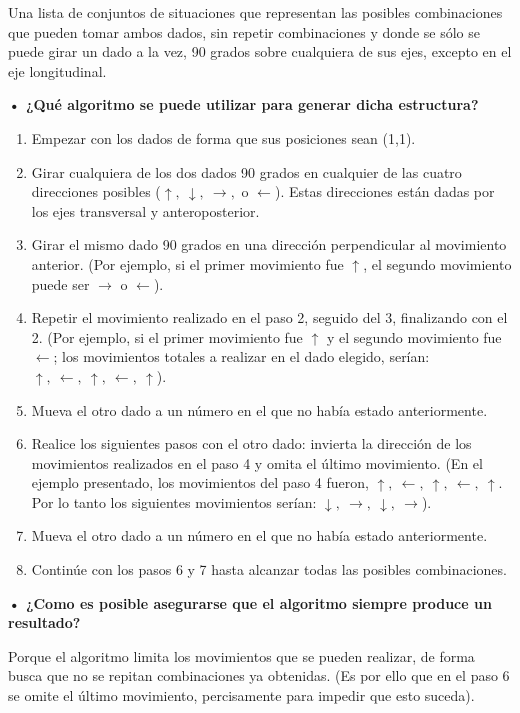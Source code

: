 \documentclass[11pt,letterpaper]{article}
\begin{document}
\noindent Una lista de conjuntos de situaciones que representan las posibles combinaciones que pueden tomar ambos dados, sin repetir combinaciones y donde se sólo se puede girar un dado a la vez, 90 grados sobre cualquiera de sus ejes, excepto en el eje longitudinal. \bigskip

\textbf{• ¿Qué algoritmo se puede utilizar para generar dicha estructura?}

\begin{enumerate}
\item Empezar con los dados de forma que sus posiciones sean (1,1).
\item Girar cualquiera de los dos dados 90 grados en cualquier de las cuatro direcciones posibles ($\uparrow, \ \downarrow, \ \rightarrow, $ o $ \leftarrow$). Estas direcciones están dadas por los ejes transversal y anteroposterior.
\item Girar el mismo dado 90 grados en una dirección perpendicular al movimiento anterior. (Por ejemplo, si el primer movimiento fue $\uparrow$, el segundo movimiento puede ser $\rightarrow$ o $\leftarrow$).
\item Repetir el movimiento realizado en el paso 2, seguido del 3, finalizando con el 2. (Por ejemplo, si el primer movimiento fue $\uparrow$ y el segundo movimiento fue $\leftarrow$; los movimientos totales a realizar en el dado elegido, serían: $\uparrow, \ \leftarrow, \ \uparrow, \ \leftarrow, \ \uparrow$).
\item Mueva el otro dado a un número en el que no había estado anteriormente.
\item Realice los siguientes pasos con el otro dado: invierta la dirección de los movimientos realizados en el paso 4 y omita el último movimiento. (En el ejemplo presentado, los movimientos del paso 4 fueron, $\uparrow, \ \leftarrow, \ \uparrow, \ \leftarrow, \ \uparrow$. Por lo tanto los siguientes movimientos serían: $\downarrow, \ \rightarrow, \ \downarrow, \ \rightarrow$).
\item Mueva el otro dado a un número en el que no había estado anteriormente.
\item Continúe con los pasos 6 y 7 hasta alcanzar todas las posibles combinaciones.
\end{enumerate}

\textbf{• ¿Como es posible asegurarse que el algoritmo siempre produce un resultado?}

\noindent Porque el algoritmo limita los movimientos que se pueden realizar, de forma busca que no se repitan combinaciones ya obtenidas. (Es por ello que en el paso 6 se omite el último movimiento, percisamente para impedir que esto suceda).
\end{document}
